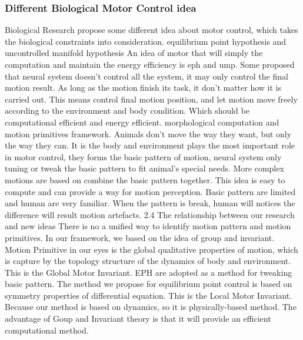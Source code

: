 \subsubsection{ Different Biological Motor Control idea}
Biological Research propose some different idea about motor control, which takes the biological constraints into consideration.
 equilibrium point hypothesis and uncontrolled manifold hypothesis
An idea of motor that will simply the computation and maintain the energy efficiency is eph and ump. Some proposed that neural system doesn’t control all the system,  it may only control the final motion result. As long as the motion finish its task, it don’t matter how it is carried out.
This means control final motion position, and let motion move freely according to the environment and body condition. Which should be computational efficient and energy efficient.
 morphological computation and motion primitives framework.
Animals don’t move the way they want, but only the way they can.
It is the body and environment plays the most important role in motor control, they forms the basic pattern of motion, neural system only tuning or tweak the basic pattern to fit animal’s special needs.
More complex motions are based on combine the basic pattern together.
This idea is easy to compute and can provide a way for motion perception.
Basic pattern are limited and human are very familiar. When the pattern is break, human will notices the difference will result motion artefacts.
2.4 The relationship between our research and new ideas
There is no a unified way to identify motion pattern and motion primitives. In our framework, we based on the idea of group and invariant.
Motion Primitive in our eyes is the global qualitative properties of motion, which is capture by the topology structure of the dynamics of body and environment. This is the Global Motor Invariant.
EPH are adopted as a method for tweaking basic pattern. The method we propose for equilibrium point control is based on symmetry properties of differential equation. This is the Local Motor Invariant.
Because our method is based on dynamics, so it is physically-based method. The advantage of Goup and Invariant theory is that it will provide an efficient computational method.